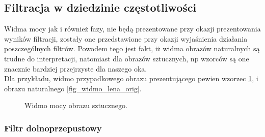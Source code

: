 \documentclass{classrep}
\begin{document}
\subsection{Filtracja w dziedzinie częstotliwości}

Widma mocy jak i również fazy, nie będą prezentowane przy okazji prezentowania wyników filtracji, zostały one przedstawione przy okazji wyjaśnienia działania poszczególnych filtrów. Powodem tego jest fakt, iż widma obrazów naturalnych są trudne do interpretacji, natomiast dla obrazów sztucznych, np wzorców są one znacznie bardziej przejrzyste dla naszego oka.\\
Dla przykładu, widmo przypadkowego obrazu prezentującego pewien wzorzec \ref{fig_pattern}, i obrazu naturalnego \ref{fig_widmo_lena_orig}.

 \begin{figure}[H]
  \centering
  \caption{Widmo mocy obrazu sztucznego.}
  \label{fig_pattern}
\end{figure}




\subsubsection{Filtr dolnoprzepustowy}
\end{document}

